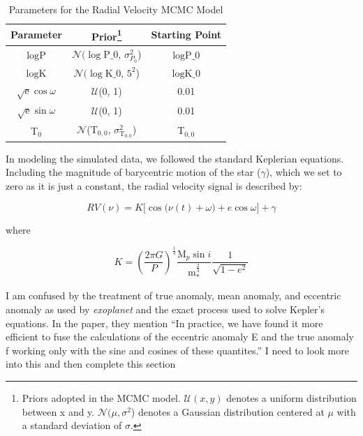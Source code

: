 \documentclass[twocolumn]{aastex631}
\newcommand{\dycomment}[1]{{\color{purple}#1}}
\begin{document}
\begin{table} 
\centering
\caption{Parameters for the Radial Velocity MCMC Model}
\label{table: rv_params}
\begin{tabular}{ c  c  c }
\hline
Parameter & Prior\footnote{\label{fn: priorLC} Priors adopted in the MCMC model. $\mathcal{U}(x,y)$ denotes a uniform distribution between x and y. $\mathcal{N}(\mu, \sigma^2$) denotes a Gaussian distribution centered at $\mu$ with a standard deviation of $\sigma$.} & Starting Point\\
\hline 

$\log \textrm{P}$  & $\mathcal{N}(\log \textrm{P_0}$, $\sigma_{P_0}^2$) &  $\log \textrm{P_0}$ \\
$\log \textrm{K}$  & $\mathcal{N}(\log \textrm{K_0}$, $5^2$) & $\log \textrm{K_0}$  \\
$\sqrt{\textrm{e}}\cos{\omega}$ & $\mathcal{U}$(0, 1) & 0.01  \\
$\sqrt{\textrm{e}}\sin{\omega}$ & $\mathcal{U}$(0, 1) & 0.01  \\
T$_0$ & $\mathcal{N}$(T$_{0,0}$, $\sigma_{\textrm{T}_{0,0}}^2$) & T$_{0,0}$  \\

\hline
\end{tabular}
\end{table}


In modeling the simulated data, we followed the standard Keplerian equations. Including the magnitude of barycentric motion of the star ($\gamma$), which we set to zero as it is just a constant, the radial velocity signal is described by:

\begin{equation} \label{eq: RVsignal}
    RV(\nu) = K \Big[\cos \big(\nu(t) + \omega \big) + e \cos \omega \Big] + \gamma
\end{equation}

where

\begin{equation} \label{eq: semi-amplitude}
    K = (\frac{2\pi G}{P})^{\frac{1}{3}} \frac{\textrm{M}_{p} \sin{i}}{\textrm{m}_{*}^\frac{2}{3}} \frac{1}{\sqrt{1-e^2}}
\end{equation}


\dycomment{I am confused by the treatment of true anomaly, mean anomaly, and eccentric anomaly as used by \textit{exoplanet} and the exact process used to solve Kepler's equations. In the paper, they mention ``In practice, we have found it more efficient to fuse the calculations of the eccentric anomaly E and the true anomaly f working only with the sine and cosines of these quantites.'' I need to look more into this and then complete this section}
\end{document}
